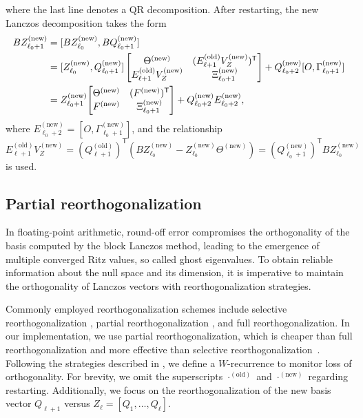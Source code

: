 \documentclass{siamart190516}
\newcommand{\Ttran}{\mathsf{T}}
\newcommand{\Ta}{\Xi}
\newcommand{\old}{\mathrm{old}}
\newcommand{\new}{\mathrm{new}}
\newcommand{\edit}[1]{\textcolor{black}{#1}} %
\begin{document}
where the last line denotes a QR decomposition. After restarting, the new Lanczos decomposition takes the form
\begin{equation*}
    \begin{aligned}
        BZ_{\ell_{0}+1}^{(\new)} &= [BZ_{\ell_{0}}^{(\new)},BQ_{\ell_{0}+1}^{(\new)}] \\ 
        &= [Z_{\ell_{0}}^{(\new)},Q_{\ell_{0}+1}^{(\new)}]\begin{bmatrix}
            \Theta^{(\new)} & (E_{\ell+1}^{(\old)}V_{Z}^{(\new)})^{\Ttran}\\E_{\ell+1}^{(\old)}V_{Z}^{(\new)} & \Ta_{\ell_{0}+1}^{(\new)}
        \end{bmatrix}+Q_{\ell_{0}+2}^{(\new)}[O,\Gamma_{\ell_{0}+1}^{(\new)}]\\ 
        &=Z_{\ell_{0}+1}^{(\new)}\edit{\begin{bmatrix}
            \Theta^{(\new)} & (F^{(\new)})^{\Ttran}\\F^{(\new)} & \Ta_{\ell_{0}+1}^{(\new)}
        \end{bmatrix}}+Q_{\ell_{0}+2}^{(\new)}E_{\ell_{0}+2}^{(\new)},
    \end{aligned}
\end{equation*}
where $E_{\ell_{0}+2}^{(\new)}=[O,\Gamma_{\ell_{0}+1}^{(\new)}]$, and the relationship
\begin{equation*}
    E_{\ell+1}^{(\old)}V_{Z}^{(\new)} = (Q_{\ell+1}^{(\old)})^{\Ttran}(BZ_{\ell_{0}}^{(\new)}-Z_{\ell_{0}}^{(\new)}\Theta^{(\new)})= (Q_{\ell_{0}+1}^{(\new)})^{\Ttran}BZ_{\ell_{0}}^{(\new)}
\end{equation*}
is used. 



\subsection{Partial reorthogonalization}
\label{sec:RO}
In floating-point arithmetic, round-off error compromises the orthogonality of the basis computed by the block Lanczos me\-thod, leading to the emergence of multiple converged Ritz values, so called ghost eigenvalues. To obtain reliable information about the null space and its dimension, it is imperative to maintain the orthogonality of Lanczos vectors with reorthogonalization strategies.

Commonly employed reorthogonalization schemes include selective reorthogonalization \cite{Parlett1979}, partial reorthogonalization \cite{Simon1984}, and full reorthogonalization. In our implementation, we use partial reorthogonalization, which is cheaper than full reorthogonalization and more effective than selective reorthogonalization~\cite{Simon1982}. Following the strategies described in \cite{Wu2000,Grimes1994}, we define a $W$-recurrence to monitor loss of orthogonality. For brevity, we omit the superscripts $\cdot^{(\old)}$ and $\cdot^{(\new)}$ regarding restarting. Additionally, we focus on the reorthogonalization of the new basis vector $Q_{\ell+1}$ versus $Z_{\ell}=[Q_{1},\dotsc,Q_{\ell}]$.
\end{document}

